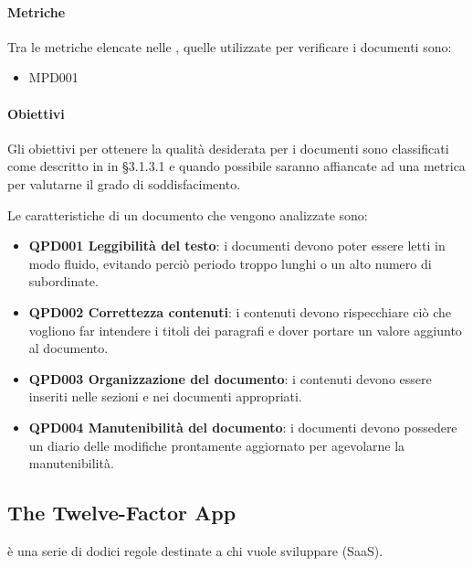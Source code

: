		\paragraph*{Metriche} %
		Tra le metriche elencate nelle \NdPd, quelle utilizzate per verificare i documenti sono:
		
		\begin{itemize}
			\item MPD001 
		\end{itemize} 
		
		\paragraph*{Obiettivi} %
		Gli obiettivi per ottenere la qualità desiderata per i documenti sono classificati come descritto in \Doc{\NdPv} in §3.1.3.1 e quando possibile saranno
		affiancate ad una metrica per valutarne il grado di soddisfacimento.
		
		Le caratteristiche di un documento che vengono analizzate sono:
		
		\begin{itemize}
			\item \textbf{QPD001 Leggibilità del testo}: i documenti devono poter essere letti in modo fluido, evitando perciò periodo troppo lunghi o un alto numero di subordinate.
			\item \textbf{QPD002 Correttezza contenuti}: i contenuti devono rispecchiare ciò che vogliono far intendere i titoli dei paragrafi e dover portare un valore aggiunto al documento.
			\item \textbf{QPD003 Organizzazione del documento}: i contenuti devono essere inseriti nelle sezioni e nei documenti appropriati.
			\item \textbf{QPD004 Manutenibilità del documento}: i documenti devono possedere un diario delle modifiche prontamente aggiornato per agevolarne la manutenibilità.
		\end{itemize}

\subsection{The Twelve-Factor App}
 è una serie di dodici regole destinate a chi vuole sviluppare  (SaaS).

